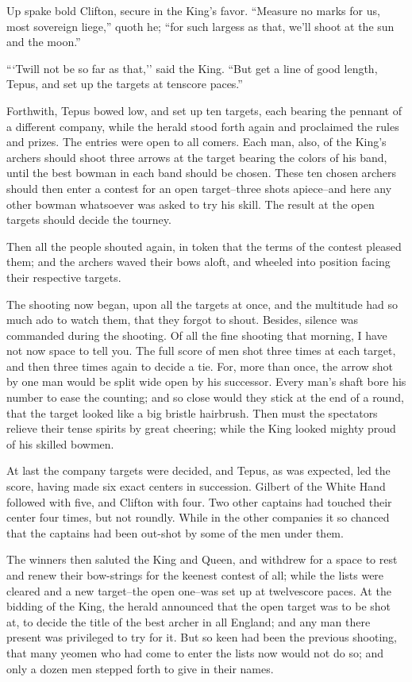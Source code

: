Up spake bold Clifton, secure in the King's favor. ``Measure no marks
for us, most sovereign liege,'' quoth he; ``for such largess as that,
we'll shoot at the sun and the moon.''

```Twill not be so far as that,'' said the King. ``But get a line of
good length, Tepus, and set up the targets at tenscore paces.''

Forthwith, Tepus bowed low, and set up ten targets, each bearing the
pennant of a different company, while the herald stood forth again and
proclaimed the rules and prizes. The entries were open to all comers.
Each man, also, of the King's archers should shoot three arrows at the
target bearing the colors of his band, until the best bowman in each
band should be chosen. These ten chosen archers should then enter a
contest for an open target--three shots apiece--and here any other
bowman whatsoever was asked to try his skill. The result at the open
targets should decide the tourney.

Then all the people shouted again, in token that the terms of the
contest pleased them; and the archers waved their bows aloft, and
wheeled into position facing their respective targets.

The shooting now began, upon all the targets at once, and the multitude
had so much ado to watch them, that they forgot to shout. Besides,
silence was commanded during the shooting. Of all the fine shooting that
morning, I have not now space to tell you. The full score of men shot
three times at each target, and then three times again to decide a tie.
For, more than once, the arrow shot by one man would be split wide open
by his successor. Every man's shaft bore his number to ease the
counting; and so close would they stick at the end of a round, that the
target looked like a big bristle hairbrush. Then must the spectators
relieve their tense spirits by great cheering; while the King looked
mighty proud of his skilled bowmen.

At last the company targets were decided, and Tepus, as was expected,
led the score, having made six exact centers in succession. Gilbert of
the White Hand followed with five, and Clifton with four. Two other
captains had touched their center four times, but not roundly. While in
the other companies it so chanced that the captains had been out-shot by
some of the men under them.

The winners then saluted the King and Queen, and withdrew for a space to
rest and renew their bow-strings for the keenest contest of all; while
the lists were cleared and a new target--the open one--was set up at
twelvescore paces. At the bidding of the King, the herald announced that
the open target was to be shot at, to decide the title of the best
archer in all England; and any man there present was privileged to try
for it. But so keen had been the previous shooting, that many yeomen who
had come to enter the lists now would not do so; and only a dozen men
stepped forth to give in their names.

